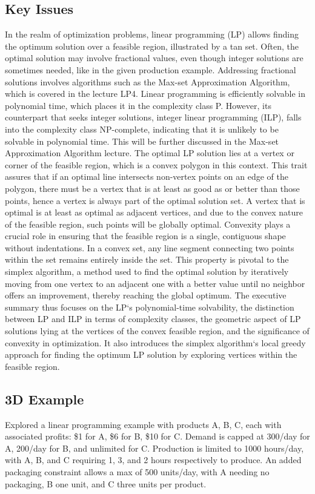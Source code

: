 \subsection*{Key Issues}
In the realm of optimization problems, linear programming (LP) allows finding the optimum solution over a feasible region, illustrated by a tan set.
Often, the optimal solution may involve fractional values, even though integer solutions are sometimes needed, like in the given production example.
Addressing fractional solutions involves algorithms such as the Max-set Approximation Algorithm, which is covered in the lecture LP4.
Linear programming is efficiently solvable in polynomial time, which places it in the complexity class P\@.
However, its counterpart that seeks integer solutions, integer linear programming (ILP), falls into the complexity class NP-complete, indicating that it is unlikely to be solvable in polynomial time.
This will be further discussed in the Max-set Approximation Algorithm lecture.
The optimal LP solution lies at a vertex or corner of the feasible region, which is a convex polygon in this context.
This trait assures that if an optimal line intersects non-vertex points on an edge of the polygon, there must be a vertex that is at least as good as or better than those points, hence a vertex is always part of the optimal solution set.
A vertex that is optimal is at least as optimal as adjacent vertices, and due to the convex nature of the feasible region, such points will be globally optimal.
Convexity plays a crucial role in ensuring that the feasible region is a single, contiguous shape without indentations.
In a convex set, any line segment connecting two points within the set remains entirely inside the set.
This property is pivotal to the simplex algorithm, a method used to find the optimal solution by iteratively moving from one vertex to an adjacent one with a better value until no neighbor offers an improvement, thereby reaching the global optimum.
The executive summary thus focuses on the LP`s polynomial-time solvability, the distinction between LP and ILP in terms of complexity classes, the geometric aspect of LP solutions lying at the vertices of the convex feasible region, and the significance of convexity in optimization.
It also introduces the simplex algorithm`s local greedy approach for finding the optimum LP solution by exploring vertices within the feasible region.

\subsection*{3D Example}
Explored a linear programming example with products A, B, C, each with associated profits: \$1 for A, \$6 for B, \$10 for C\@.
Demand is capped at 300/day for A, 200/day for B, and unlimited for C\@.
Production is limited to 1000 hours/day, with A, B, and C requiring 1, 3, and 2 hours respectively to produce.
An added packaging constraint allows a max of 500 units/day, with A needing no packaging, B one unit, and C three units per product.

